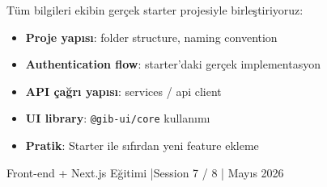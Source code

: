 \documentclass[12pt, a4paper]{article}
\begin{document}
\begin{infobox}
Tüm bilgileri ekibin gerçek starter projesiyle birleştiriyoruz:
\begin{itemize}
  \item \textbf{Proje yapısı}: folder structure, naming convention
  \item \textbf{Authentication flow}: starter'daki gerçek implementasyon
  \item \textbf{API çağrı yapısı}: services / api client
  \item \textbf{UI library}: \texttt{@gib-ui/core} kullanımı
  \item \textbf{Pratik}: Starter ile sıfırdan yeni feature ekleme
\end{itemize}
\end{infobox}

\vspace{16pt}
\begin{center}
  \color{gray}\sffamily\small
  Front-end + Next.js Eğitimi \quad|\quad Session 7 / 8 \quad| Mayıs 2026
\end{center}
\end{document}
